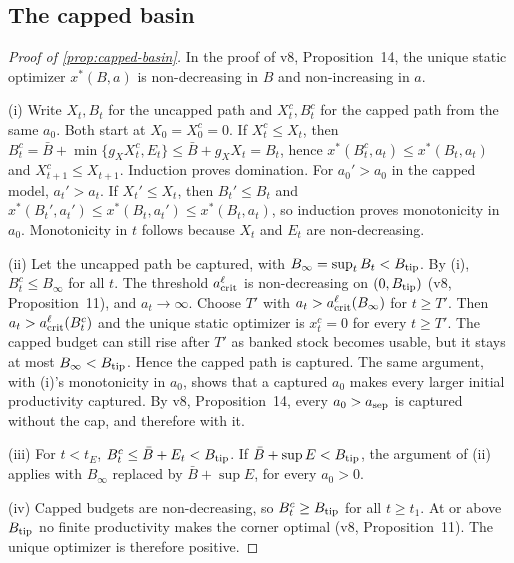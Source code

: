 \documentclass[11pt,a4paper]{article}
\theoremstyle{definition}
\newcommand{\Btip}{B_{\rm tip}}
\newcommand{\acrit}{a_{\rm crit}^{\ell}}
\begin{document}
\subsection{The capped basin}
\label{app:capped-proof}
\begin{proof}[Proof of \cref{prop:capped-basin}]
In the proof of v8, Proposition~14, the unique static optimizer $x^*(B,a)$ is
non-decreasing in $B$ and non-increasing in $a$.

(i) Write $X_t,B_t$ for the uncapped path and $X_t^c,B_t^c$ for the capped path
from the same $a_0$. Both start at $X_0=X_0^c=0$. If $X_t^c\leq X_t$, then
$B_t^c=\bar B+\min\{g_XX_t^c,E_t\}\leq\bar B+g_XX_t=B_t$, hence
$x^*(B_t^c,a_t)\leq x^*(B_t,a_t)$ and $X_{t+1}^c\leq X_{t+1}$. Induction proves
domination. For $a_0'>a_0$ in the capped model, $a_t'>a_t$. If $X_t'\leq X_t$,
then $B_t'\leq B_t$ and $x^*(B_t',a_t')\leq x^*(B_t,a_t')\leq x^*(B_t,a_t)$, so
induction proves monotonicity in $a_0$. Monotonicity in $t$ follows because
$X_t$ and $E_t$ are non-decreasing.

(ii) Let the uncapped path be captured, with
$B_\infty=\sup_tB_t<\Btip$. By (i), $B_t^c\leq B_\infty$ for all $t$. The
threshold $\acrit$ is non-decreasing on $(0,\Btip)$ (v8, Proposition~11), and
$a_t\to\infty$. Choose $T'$ with $a_t>\acrit(B_\infty)$ for $t\geq T'$. Then
$a_t>\acrit(B_t^c)$ and the unique static optimizer is $x_t^c=0$ for every
$t\geq T'$. The capped budget can still rise after $T'$ as banked stock becomes
usable, but it stays at most $B_\infty<\Btip$. Hence the capped path is
captured. The same argument, with (i)'s monotonicity in $a_0$, shows that a
captured $a_0$ makes every larger initial productivity captured. By v8,
Proposition~14, every $a_0>a_{\rm sep}$ is captured without the cap, and
therefore with it.

(iii) For $t<t_E$, $B_t^c\leq\bar B+E_t<\Btip$. If
$\bar B+\sup E<\Btip$, the argument of (ii) applies with $B_\infty$ replaced by
$\bar B+\sup E$, for every $a_0>0$.

(iv) Capped budgets are non-decreasing, so $B_t^c\geq\Btip$ for all $t\geq t_1$.
At or above $\Btip$ no finite productivity makes the corner optimal (v8,
Proposition~11). The unique optimizer is therefore positive.
\end{proof}
\end{document}
